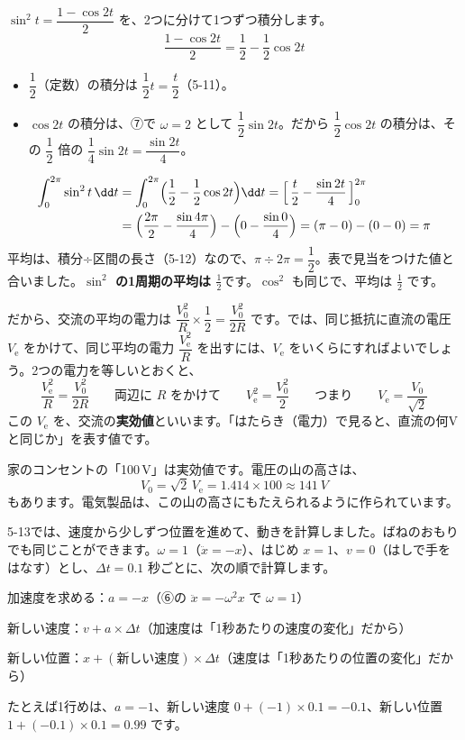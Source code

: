 $\sin^2t=\dfrac{1-\cos2t}{2}$ を、2つに分けて1つずつ積分します。
\[ \frac{1-\cos2t}{2}=\frac{1}{2}-\frac{1}{2}\cos2t \]
\begin{itemize}[leftmargin=1.2\zw, itemsep=1pt, topsep=2pt, label={\color{bkTheme}●}]
\item $\dfrac{1}{2}$（定数）の積分は $\dfrac{1}{2}t=\dfrac{t}{2}$（5-11）。
\item $\cos2t$ の積分は、⑦で $\omega=2$ として $\dfrac{1}{2}\sin2t$。だから $\dfrac{1}{2}\cos2t$ の積分は、その $\dfrac{1}{2}$ 倍の $\dfrac{1}{4}\sin2t=\dfrac{\sin2t}{4}$。
\end{itemize}
\begin{align*}
\int_0^{2\pi}\sin^2t\,\dd t&=\int_0^{2\pi}\Bigl(\frac{1}{2}-\frac{1}{2}\cos2t\Bigr)\dd t=\Bigl[\,\frac{t}{2}-\frac{\sin2t}{4}\,\Bigr]_0^{2\pi}\\
&=\Bigl(\frac{2\pi}{2}-\frac{\sin4\pi}{4}\Bigr)-\Bigl(0-\frac{\sin0}{4}\Bigr)=(\pi-0)-(0-0)=\pi
\end{align*}
平均は、積分÷区間の長さ（5-12）なので、$\pi\div2\pi=\dfrac{1}{2}$。表で見当をつけた値と合いました。\textbf{$\sin^2$ の1周期の平均は $\frac{1}{2}$}です。$\cos^2$ も同じで、平均は $\frac{1}{2}$ です。

だから、交流の平均の電力は $\dfrac{V_0^2}{R}\times\dfrac{1}{2}=\dfrac{V_0^2}{2R}$ です。では、同じ抵抗に直流の電圧 $V_{\mathrm{e}}$ をかけて、同じ平均の電力 $\dfrac{V_{\mathrm{e}}^2}{R}$ を出すには、$V_{\mathrm{e}}$ をいくらにすればよいでしょう。2つの電力を等しいとおくと、
\[ \frac{V_{\mathrm{e}}^2}{R}=\frac{V_0^2}{2R}\qquad\text{両辺に }R\text{ をかけて}\qquad V_{\mathrm{e}}^2=\frac{V_0^2}{2}\qquad\text{つまり}\qquad V_{\mathrm{e}}=\frac{V_0}{\sqrt2} \]
この $V_{\mathrm{e}}$ を、交流の\textbf{実効値}といいます。「はたらき（電力）で見ると、直流の何Vと同じか」を表す値です。

家のコンセントの「100\,V」は実効値です。電圧の山の高さは、
\[ V_0=\sqrt2\,V_{\mathrm{e}}=1.414\times100\approx\qty{141}{V} \]
もあります。電気製品は、この山の高さにもたえられるように作られています。


\label{bk:5-15:sim}5-13では、速度から少しずつ位置を進めて、動きを計算しました。ばねのおもりでも同じことができます。$\omega=1$（$\ddot{x}=-x$）、はじめ $x=1$、$v=0$（はしで手をはなす）とし、$\Delta t=0.1$ 秒ごとに、次の順で計算します。
\begin{enumerate}[label={\bkcircled[bkTheme]{\arabic*}}, leftmargin=2.4\zw, itemsep=1pt, topsep=2pt]
\item 加速度を求める：$a=-x$（⑥の $\ddot{x}=-\omega^2x$ で $\omega=1$）
\item 新しい速度：$v+a\times\Delta t$（加速度は「1秒あたりの速度の変化」だから）
\item 新しい位置：$x+(\text{新しい速度})\times\Delta t$（速度は「1秒あたりの位置の変化」だから）
\end{enumerate}
たとえば1行めは、$a=-1$、新しい速度 $0+(-1)\times0.1=-0.1$、新しい位置 $1+(-0.1)\times0.1=0.99$ です。

